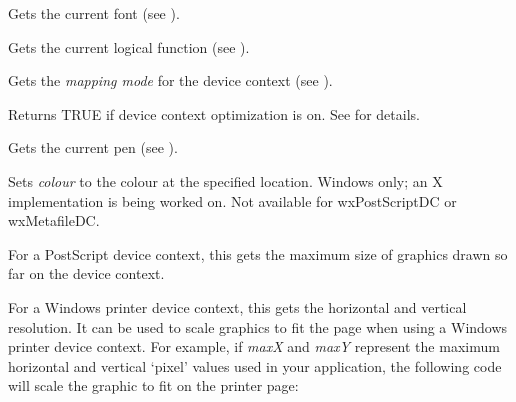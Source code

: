 
Gets the current font (see ).

\label{wxdcgetlogicalfunction}


Gets the current logical function (see ).

\label{wxdcgetmapmode}


Gets the {\it mapping mode} for the device context (see ).

\label{wxdcgetoptimization}


Returns TRUE if device context optimization is on.
See  for details.

\label{wxdcgetpen}



Gets the current pen (see ).

\label{wxdcgetpixel}


Sets {\it colour} to the colour at the specified location. Windows only; an X implementation
is being worked on. Not available for wxPostScriptDC or wxMetafileDC.



\label{wxdcgetsize}


For a PostScript device context, this gets the maximum size of graphics
drawn so far on the device context.

For a Windows printer device context, this gets the horizontal and vertical
resolution. It can be used to scale graphics to fit the page when using
a Windows printer device context. For example, if {\it maxX} and {\it maxY}\rtfsp
represent the maximum horizontal and vertical `pixel' values used in your
application, the following code will scale the graphic to fit on the
printer page:

